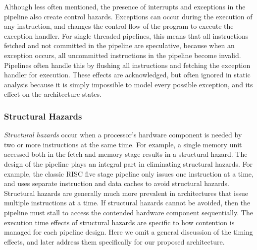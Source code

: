 Although less often mentioned, the presence of interrupts and exceptions in the pipeline also create control hazards. 
Exceptions can occur during the execution of any instruction, and changes the control flow of the program to execute the exception handler.
For single threaded pipelines, this means that all instructions fetched and not committed in the pipeline are speculative, because when an exception occurs, all uncommitted instructions in the pipeline become invalid.
Pipelines often handle this by flushing all instructions and fetching the exception handler for execution.      
These effects are acknowledged, but often ignored in static analysis because it is simply impossible to model every possible exception, and its effect on the architecture states. 
 
\subsubsection{Structural Hazards}
\emph{Structural hazards} occur when a processor's hardware component is needed by two or more instructions at the same time. 
For example, a single memory unit accessed both in the fetch and memory stage results in a structural hazard. 
The design of the pipeline plays an integral part in eliminating structural hazards. 
For example, the classic RISC five stage pipeline only issues one instruction at a time, and uses separate instruction and data caches to avoid structural hazards.
Structural hazards are generally much more prevalent in architectures that issue multiple instructions at a time.
If structural hazards cannot be avoided, then the pipeline must stall to access the contended hardware component sequentially.
The execution time effects of structural hazards are specific to how contention is managed for each pipeline design.
Here we omit a general discussion of the timing effects, and later address them specifically for our proposed architecture. 

